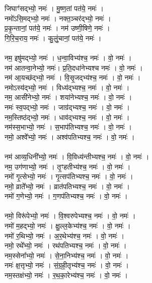 जिघाꣳ॑सद्भ्यो॒ नमः॑ । मु॒ष्ण॒तां पत॑ये॒ नमः॑ ।\\
नमो॑ऽसि॒मद्भ्यो॒ नमः॑ । नक्त॒ञ्चर॑द्भ्यो॒ नमः॑ ।\\
प्र॒कृ॒न्तानां॒ पत॑ये॒ नमः॑ । नम॑ उष्णी॒षिणे॒ नमः॑ ।\\
गि॒रि॒च॒राय॒ नमः॑ । कु॒लुं॒चानां॒ पत॑ये॒  नमः॑ ।\\
\\
नम॒ इषु॑मद्भ्यो॒  नमः॑ । ध॒न्वा॒विभ्य॑श्च॒  नमः॑ । वो॒  नमः॑ ।\\
नम॑ आतन्वा॒नेभ्यो॒ नमः॑। प्र॒ति॒दधा॑नेभ्यश्च  नमः॑ । वो॒ नमः॑ ।\\
नम॑ आ॒यच्छ॑द्भ्यो॒  नमः॑ ।  वि॒सृ॒जद्भ्य॑श्च॒  नमः॑ ।  वो॒ नमः॑ ।\\
नमोऽस्य॑द्भ्यो॒  नमः॑ । विध्य॑द्भ्यश्च॒  नमः॑ ।  वो॒ नमः॑ ।\\
नम॒ आसी॑नेभ्यो॒  नमः॑ । शया॑नेभ्यश्च॒  नमः॑ । वो॒ नमः॑ ।\\
नमः॑ स्व॒पद्भ्यो॒  नमः॑ । जाग्र॑द्भ्यश्च॒  नमः॑ ।  वो॒ नमः॑ ।\\
नम॒स्तिष्ठ॑द्भ्यो॒  नमः॑ । धाव॑द्भ्यश्च॒  नमः॑ ।  वो॒ नमः॑ ।\\
नम॑स्स॒भाभ्यो॒  नमः॑ । स॒भाप॑तिभ्यश्च॒ नमः॑ । वो॒ नमः॑ ।\\
नमो॒ अश्वे᳚भ्यो॒  नमः॑ । अश्व॑पतिभ्यश्च॒  नमः॑ । वो॒ नमः॑ ।\\
\\
नम॑ आव्य॒धिनी᳚भ्यो॒  नमः॑ । वि॒विध्य॑न्तीभ्यश्च॒  नमः॑ ।  वो॒ नमः॑ ।\\
नम॒ उग॑णाभ्यो॒ नमः॑ । तृ॒ꣳहतीभ्य॑श्च॒ नमः॑ । वो॒ नमः॑ ।\\
नमो॑ गृ॒त्सेभ्यो॒ नमः॑ । गृ॒त्सप॑तिभ्यश्च॒ नमः॑ । वो॒ नमः॑ ।\\
नमो॒ व्राते᳚भ्यो॒ नमः॑ । व्रात॑पतिभ्यश्च॒ नमः॑ । वो॒ नमः॑ ।\\
नमो॑ ग॒णेभ्यो॒ नमः॑ । ग॒णप॑तिभ्यश्च॒ नमः॑ । वो॒ नमः॑ ।\\
\\
नमो॒ विरू॑पेभ्यो॒ नमः॑ । वि॒श्वरुपेभ्यश्च॒ नमः॑ । वो॒ नमः॑ ।\\
नमो॑ म॒हद्भ्यो॒ नमः॑ । क्षु॒ल्ल॒केभ्य॑श्च॒ नमः॑ । वो॒ नमः॑ ।\\
नमो॑ र॒थिभ्यो॒ नमः॑ । अ॒र॒थेभ्य॑श्च॒ नमः॑ । वो॒ नमः॑ ।\\
नमो॒ रथे᳚भ्यो॒ नमः॑ । रथ॑पतिभ्यश्च॒ नमः॑ । वो॒ नमः॑ ।\\
नम॒स्सेना᳚भ्यो॒ नमः॑ । से॒ना॒निभ्य॑श्च॒ नमः॑ । वो॒ नमः॑ ।\\
नमः॑ क्ष॒त्तृभ्यो॒ नमः॑ । सं॒ग्र॒ही॒तृभ्य॑श्च॒ नमः॑ । वो॒ नमः॑ ।\\
नम॒स्तक्ष॑भ्यो॒ नमः॑ । र॒थ॒का॒रेभ्य॑श्च॒ नमः॑ । वो॒ नमः॑ ।\\
